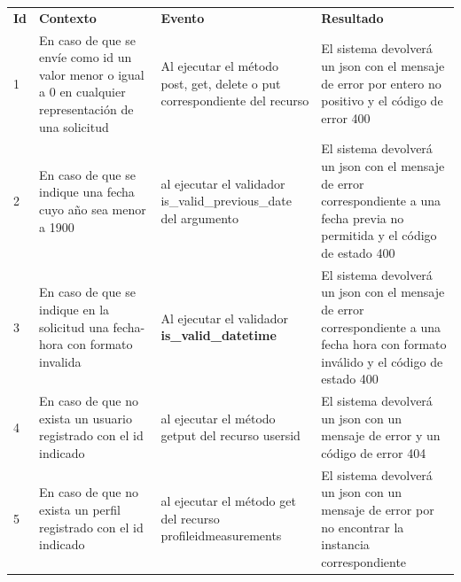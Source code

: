 \begin{center}
\begin{longtable}{|p{0.5cm}|p{4cm}|p{4cm}|p{5cm}|}
\hline \hline \rowcolor[gray]{0.9}
	\multicolumn{4}{||c|}{\textbf{Criterio de aceptación}} \\
    \hline  \rowcolor[gray]{0.9}
        \textbf{Id} &
        \textbf{Contexto} &
        \textbf{Evento}&
        \textbf{Resultado} \\
    \hline
1&En caso de que se envíe como id un valor menor o igual a 0 en cualquier representación  de una solicitud & Al ejecutar el método post, get, delete o put correspondiente del recurso & El sistema devolverá un json con el mensaje de error por entero no positivo y el código de error 400 \\ \hline
	\hline
2&En caso de que se indique una fecha cuyo año sea menor a 1900 & al ejecutar el validador is\_valid\_previous\_date del argumento  & El sistema devolverá un json con el mensaje de error correspondiente a una fecha previa no permitida y el código de estado 400 \\ 		\hline
	\hline
3&En caso de que se indique en la solicitud una fecha-hora con formato invalida 
& Al ejecutar el validador \textbf{ is\_valid\_datetime}  & El sistema devolverá un json con el mensaje de error correspondiente a una fecha hora con formato inválido y el código de estado 400\\ \hline
    \hline
4&En caso de que no exista un usuario registrado con el id indicado & al ejecutar el método get\/put del recurso \/users\/id  & El sistema devolverá un json con un mensaje de error y un código de error 404 \\ \hline
	\hline
5&En caso de que no exista un perfil registrado con el id indicado & al ejecutar el método get del recurso \/profile\/id\/measurements  & El sistema devolverá un json con un mensaje de error por no encontrar la instancia correspondiente \\ \hline

  \end{longtable}
\end{center}


